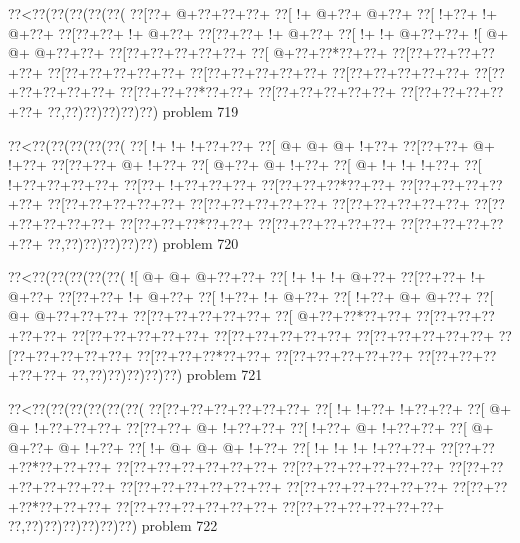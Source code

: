 \vbox{\vbox{\goo
\0??<\0??(\0??(\0??(\0??(\0??(
\0??[\0??+\- @+\0??+\0??+\0??+
\0??[\- !+\- @+\0??+\- @+\0??+
\0??[\- !+\0??+\- !+\- @+\0??+
\0??[\0??+\0??+\- !+\- @+\0??+
\0??[\0??+\0??+\- !+\- @+\0??+
\0??[\- !+\- !+\- @+\0??+\0??+
\- ![\- @+\- @+\- @+\0??+\0??+
\0??[\0??+\0??+\0??+\0??+\0??+
\0??[\- @+\0??+\0??*\0??+\0??+
\0??[\0??+\0??+\0??+\0??+\0??+
\0??[\0??+\0??+\0??+\0??+\0??+
\0??[\0??+\0??+\0??+\0??+\0??+
\0??[\0??+\0??+\0??+\0??+\0??+
\0??[\0??+\0??+\0??+\0??+\0??+
\0??[\0??+\0??+\0??*\0??+\0??+
\0??[\0??+\0??+\0??+\0??+\0??+
\0??[\0??+\0??+\0??+\0??+\0??+
\0??,\0??)\0??)\0??)\0??)\0??)
}
\hfil problem 719\hfil\break
}

\vbox{\vbox{\goo
\0??<\0??(\0??(\0??(\0??(\0??(
\0??[\- !+\- !+\- !+\0??+\0??+
\0??[\- @+\- @+\- @+\- !+\0??+
\0??[\0??+\0??+\- @+\- !+\0??+
\0??[\0??+\0??+\- @+\- !+\0??+
\0??[\- @+\0??+\- @+\- !+\0??+
\0??[\- @+\- !+\- !+\- !+\0??+
\0??[\- !+\0??+\0??+\0??+\0??+
\0??[\0??+\- !+\0??+\0??+\0??+
\0??[\0??+\0??+\0??*\0??+\0??+
\0??[\0??+\0??+\0??+\0??+\0??+
\0??[\0??+\0??+\0??+\0??+\0??+
\0??[\0??+\0??+\0??+\0??+\0??+
\0??[\0??+\0??+\0??+\0??+\0??+
\0??[\0??+\0??+\0??+\0??+\0??+
\0??[\0??+\0??+\0??*\0??+\0??+
\0??[\0??+\0??+\0??+\0??+\0??+
\0??[\0??+\0??+\0??+\0??+\0??+
\0??,\0??)\0??)\0??)\0??)\0??)
}
\hfil problem 720\hfil\break
}

\vbox{\vbox{\goo
\0??<\0??(\0??(\0??(\0??(\0??(
\- ![\- @+\- @+\- @+\0??+\0??+
\0??[\- !+\- !+\- !+\- @+\0??+
\0??[\0??+\0??+\- !+\- @+\0??+
\0??[\0??+\0??+\- !+\- @+\0??+
\0??[\- !+\0??+\- !+\- @+\0??+
\0??[\- !+\0??+\- @+\- @+\0??+
\0??[\- @+\- @+\0??+\0??+\0??+
\0??[\0??+\0??+\0??+\0??+\0??+
\0??[\- @+\0??+\0??*\0??+\0??+
\0??[\0??+\0??+\0??+\0??+\0??+
\0??[\0??+\0??+\0??+\0??+\0??+
\0??[\0??+\0??+\0??+\0??+\0??+
\0??[\0??+\0??+\0??+\0??+\0??+
\0??[\0??+\0??+\0??+\0??+\0??+
\0??[\0??+\0??+\0??*\0??+\0??+
\0??[\0??+\0??+\0??+\0??+\0??+
\0??[\0??+\0??+\0??+\0??+\0??+
\0??,\0??)\0??)\0??)\0??)\0??)
}
\hfil problem 721\hfil\break
}

\vbox{\vbox{\goo
\0??<\0??(\0??(\0??(\0??(\0??(\0??(
\0??[\0??+\0??+\0??+\0??+\0??+\0??+
\0??[\- !+\- !+\0??+\- !+\0??+\0??+
\0??[\- @+\- @+\- !+\0??+\0??+\0??+
\0??[\0??+\0??+\- @+\- !+\0??+\0??+
\0??[\- !+\0??+\- @+\- !+\0??+\0??+
\0??[\- @+\- @+\0??+\- @+\- !+\0??+
\0??[\- !+\- @+\- @+\- @+\- !+\0??+
\0??[\- !+\- !+\- !+\- !+\0??+\0??+
\0??[\0??+\0??+\0??*\0??+\0??+\0??+
\0??[\0??+\0??+\0??+\0??+\0??+\0??+
\0??[\0??+\0??+\0??+\0??+\0??+\0??+
\0??[\0??+\0??+\0??+\0??+\0??+\0??+
\0??[\0??+\0??+\0??+\0??+\0??+\0??+
\0??[\0??+\0??+\0??+\0??+\0??+\0??+
\0??[\0??+\0??+\0??*\0??+\0??+\0??+
\0??[\0??+\0??+\0??+\0??+\0??+\0??+
\0??[\0??+\0??+\0??+\0??+\0??+\0??+
\0??,\0??)\0??)\0??)\0??)\0??)\0??)
}
\hfil problem 722\hfil\break
}

